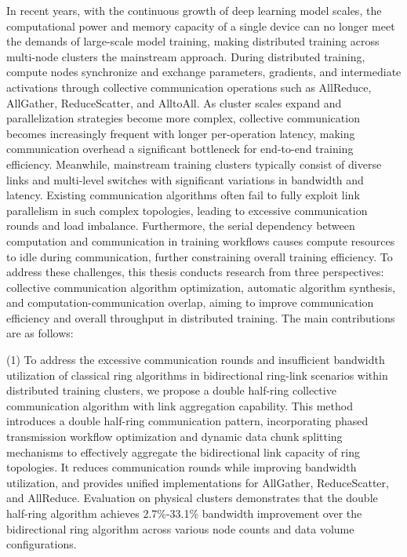 \cleardoublepage
{}

In recent years, with the continuous growth of deep learning model scales, the computational power and memory capacity of a single device can no longer meet the demands of large-scale model training, making distributed training across multi-node clusters the mainstream approach. During distributed training, compute nodes synchronize and exchange parameters, gradients, and intermediate activations through collective communication operations such as AllReduce, AllGather, ReduceScatter, and AlltoAll. As cluster scales expand and parallelization strategies become more complex, collective communication becomes increasingly frequent with longer per-operation latency, making communication overhead a significant bottleneck for end-to-end training efficiency. Meanwhile, mainstream training clusters typically consist of diverse links and multi-level switches with significant variations in bandwidth and latency. Existing communication algorithms often fail to fully exploit link parallelism in such complex topologies, leading to excessive communication rounds and load imbalance. Furthermore, the serial dependency between computation and communication in training workflows causes compute resources to idle during communication, further constraining overall training efficiency.
To address these challenges, this thesis conducts research from three perspectives: collective communication algorithm optimization, automatic algorithm synthesis, and computation-communication overlap, aiming to improve communication efficiency and overall throughput in distributed training. The main contributions are as follows:

(1) To address the excessive communication rounds and insufficient bandwidth utilization of classical ring algorithms in bidirectional ring-link scenarios within distributed training clusters, we propose a double half-ring collective communication algorithm with link aggregation capability. This method introduces a double half-ring communication pattern, incorporating phased transmission workflow optimization and dynamic data chunk splitting mechanisms to effectively aggregate the bidirectional link capacity of ring topologies. It reduces communication rounds while improving bandwidth utilization, and provides unified implementations for AllGather, ReduceScatter, and AllReduce. Evaluation on physical clusters demonstrates that the double half-ring algorithm achieves 2.7\%-33.1\% bandwidth improvement over the bidirectional ring algorithm across various node counts and data volume configurations.

